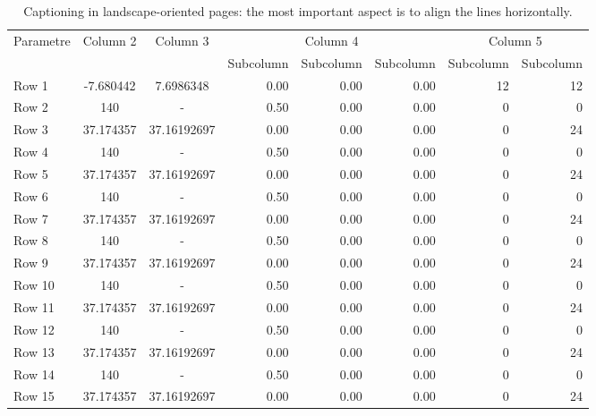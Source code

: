 \begin{landscape}
\thispagestyle{empty}
\vspace{6pt} %
\begin{table}[htp]
\centering
\setlength{\tabcolsep}{14pt}
\captionsetup{justification=centerlast}
\caption{Captioning in landscape-oriented pages: the most important aspect is to align the lines horizontally.}
\label{table:ch2-3}
\begin{tabular}{lccrrrrr}
\toprule\midrule
\multirow{2}{*}{Parametre} & \multirow{2}{*}{Column 2} & \multirow{2}{*}{Column 3} & \multicolumn{3}{c}{Column 4} & \multicolumn{2}{c}{Column 5}\\ \cmidrule(lr){4-6} \cmidrule(lr){7-8}
  & & & Subcolumn & Subcolumn & Subcolumn & Subcolumn & Subcolumn\\
\midrule
Row 1 & -7.680442 & 7.6986348 & 0.00 & 0.00 & 0.00 & 12 & 12 \\
Row 2 & 140 & - & 0.50 & 0.00 & 0.00 & 0 & 0 \\
Row 3 & 37.174357 & 37.16192697 & 0.00 & 0.00 & 0.00 & 0 & 24 \\
Row 4 & 140 & - & 0.50 & 0.00 & 0.00 & 0 & 0 \\
Row 5 & 37.174357 & 37.16192697 & 0.00 & 0.00 & 0.00 & 0 & 24 \\
Row 6 & 140 & - & 0.50 & 0.00 & 0.00 & 0 & 0 \\
Row 7 & 37.174357 & 37.16192697 & 0.00 & 0.00 & 0.00 & 0 & 24 \\
Row 8 & 140 & - & 0.50 & 0.00 & 0.00 & 0 & 0 \\
Row 9 & 37.174357 & 37.16192697 & 0.00 & 0.00 & 0.00 & 0 & 24 \\
Row 10 & 140 & - & 0.50 & 0.00 & 0.00 & 0 & 0 \\
Row 11 & 37.174357 & 37.16192697 & 0.00 & 0.00 & 0.00 & 0 & 24 \\
Row 12 & 140 & - & 0.50 & 0.00 & 0.00 & 0 & 0 \\
Row 13 & 37.174357 & 37.16192697 & 0.00 & 0.00 & 0.00 & 0 & 24 \\
Row 14 & 140 & - & 0.50 & 0.00 & 0.00 & 0 & 0 \\
Row 15 & 37.174357 & 37.16192697 & 0.00 & 0.00 & 0.00 & 0 & 24 \\
\bottomrule
\end{tabular}
\end{table}
\vspace{-6pt} %
\vfill\hbox{ }

\ifodd\value{page} %
\end{landscape}

